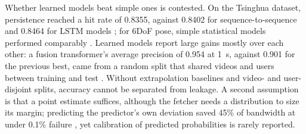 Whether learned models beat simple ones is contested. On the Tsinghua dataset, persistence reached a hit rate of 0.8355, against 0.8402 for sequence-to-sequence and 0.8464 for LSTM models \cite{W2963428739}; for 6DoF pose, simple statistical models performed comparably \cite{W4379805466}. Learned models report large gains mostly over each other: a fusion transformer's average precision of 0.954 at 1~s, against 0.901 for the previous best, came from a random split that shared videos and users between training and test \cite{W4387148495}. Without extrapolation baselines and video- and user-disjoint splits, accuracy cannot be separated from leakage. A second assumption is that a point estimate suffices, although the fetcher needs a distribution to size its margin; predicting the predictor's own deviation saved 45\% of bandwidth at under 0.1\% failure \cite{W2585813514}, yet calibration of predicted probabilities is rarely reported.


